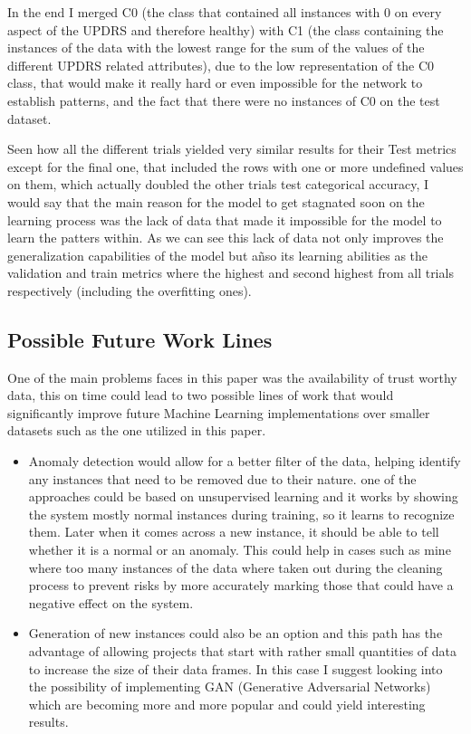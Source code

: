 \documentclass[12pt, a4paper]{article}
\begin{document}
	\vspace{10mm}
	
	In the end I merged C0 (the class that contained all instances with 0 on every aspect of the UPDRS and therefore healthy) with C1 (the class containing the instances of the data with the lowest range for the sum of the values of the different UPDRS related attributes), due to the low representation of the C0 class, that would make it really hard or even impossible for the network to establish patterns, and the fact that there were no instances of C0 on the test dataset.
	
	Seen how all the different trials yielded very similar results for their Test metrics except for the final one, that included the rows with one or more undefined values on them, which actually doubled the other trials test categorical accuracy, I would say that the main reason for the model to get stagnated soon on the learning process was the lack of data that made it impossible for the model to learn the patters within. As we can see this lack of data not only improves the generalization capabilities of the model but añso its learning abilities as the validation and train metrics where the highest and second highest from all trials respectively (including the overfitting ones).
	
	
	
	\clearpage
	
	\subsection{Possible Future Work Lines}
	
	One of the main problems faces in this paper was the availability of trust worthy data, this on time could lead to two possible lines of work that would significantly improve future Machine Learning implementations over smaller datasets such as the one utilized in this paper.
	
	\begin{itemize}
		\item Anomaly detection would allow for a better filter of the data, helping identify any instances that need to be removed due to their nature. one of the approaches could be based on unsupervised learning and it works by showing the system mostly normal instances during training, so it learns to recognize them. Later when it comes across a new instance, it should be able to tell whether it is a normal or an anomaly. This could help in cases such as mine where too many instances of the data where taken out during the cleaning process to prevent risks by more accurately marking those that could have a negative effect on the system.
		
		\item Generation of new instances could also be an option and this path has the advantage of allowing projects that start with rather small quantities of data to increase the size of their data frames. In this case I suggest looking into the possibility of implementing GAN (Generative Adversarial Networks) which are becoming more and more popular and could yield interesting results.
		
	\end{itemize}
	
\end{document}

